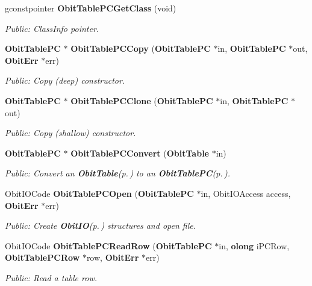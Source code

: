 \begin{CompactItemize}
gconstpointer {\bf Obit\-Table\-PCGet\-Class} (void)
\begin{CompactList}\small\item\em Public: Class\-Info pointer. \item\end{CompactList}\item 
{\bf Obit\-Table\-PC} $\ast$ {\bf Obit\-Table\-PCCopy} ({\bf Obit\-Table\-PC} $\ast$in, {\bf Obit\-Table\-PC} $\ast$out, {\bf Obit\-Err} $\ast$err)
\begin{CompactList}\small\item\em Public: Copy (deep) constructor. \item\end{CompactList}\item 
{\bf Obit\-Table\-PC} $\ast$ {\bf Obit\-Table\-PCClone} ({\bf Obit\-Table\-PC} $\ast$in, {\bf Obit\-Table\-PC} $\ast$out)
\begin{CompactList}\small\item\em Public: Copy (shallow) constructor. \item\end{CompactList}\item 
{\bf Obit\-Table\-PC} $\ast$ {\bf Obit\-Table\-PCConvert} ({\bf Obit\-Table} $\ast$in)
\begin{CompactList}\small\item\em Public: Convert an {\bf Obit\-Table}{\rm (p.\,\pageref{structObitTable})} to an {\bf Obit\-Table\-PC}{\rm (p.\,\pageref{structObitTablePC})}. \item\end{CompactList}\item 
Obit\-IOCode {\bf Obit\-Table\-PCOpen} ({\bf Obit\-Table\-PC} $\ast$in, Obit\-IOAccess access, {\bf Obit\-Err} $\ast$err)
\begin{CompactList}\small\item\em Public: Create {\bf Obit\-IO}{\rm (p.\,\pageref{structObitIO})} structures and open file. \item\end{CompactList}\item 
Obit\-IOCode {\bf Obit\-Table\-PCRead\-Row} ({\bf Obit\-Table\-PC} $\ast$in, {\bf olong} i\-PCRow, {\bf Obit\-Table\-PCRow} $\ast$row, {\bf Obit\-Err} $\ast$err)
\begin{CompactList}\small\item\em Public: Read a table row. \item\end{CompactList}\item 

\end{CompactItemize}
